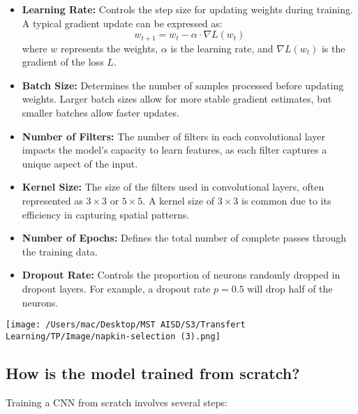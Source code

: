 \documentclass{article}
\begin{document}
\begin{itemize}
    \item \textbf{Learning Rate:} Controls the step size for updating weights during training. A typical gradient update can be expressed as:
    \[
    w_{t+1} = w_t - \alpha \cdot \nabla L(w_t)
    \]
    where \( w \) represents the weights, \( \alpha \) is the learning rate, and \( \nabla L(w_t) \) is the gradient of the loss \( L \).
    \item \textbf{Batch Size:} Determines the number of samples processed before updating weights. Larger batch sizes allow for more stable gradient estimates, but smaller batches allow faster updates.
    \item \textbf{Number of Filters:} The number of filters in each convolutional layer impacts the model’s capacity to learn features, as each filter captures a unique aspect of the input.
    \item \textbf{Kernel Size:} The size of the filters used in convolutional layers, often represented as \(3 \times 3\) or \(5 \times 5\). A kernel size of \(3 \times 3\) is common due to its efficiency in capturing spatial patterns.
    \item \textbf{Number of Epochs:} Defines the total number of complete passes through the training data.
    \item \textbf{Dropout Rate:} Controls the proportion of neurons randomly dropped in dropout layers. For example, a dropout rate \( p = 0.5 \) will drop half of the neurons.
\end{itemize}
\texttt{[image: /Users/mac/Desktop/MST AISD/S3/Transfert Learning/TP/Image/napkin-selection (3).png]}

\subsection{How is the model trained from scratch?}

Training a CNN from scratch involves several steps:
\end{document}
